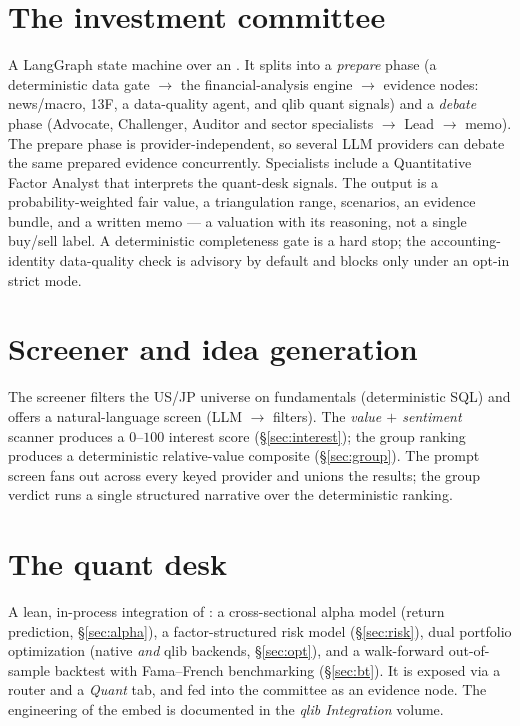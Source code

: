 \documentclass[11pt]{article}
\begin{document}
\section{The investment committee}
A LangGraph state machine over an . It splits into a
\emph{prepare} phase (a deterministic data gate $\to$ the financial-analysis engine
$\to$ evidence nodes: news/macro, 13F, a data-quality agent, and qlib quant
signals) and a \emph{debate} phase (Advocate, Challenger, Auditor and sector
specialists $\to$ Lead $\to$ memo). The prepare phase is provider-independent, so
several LLM providers can debate the same prepared evidence concurrently.
Specialists include a Quantitative Factor Analyst that interprets the quant-desk
signals. The output is a probability-weighted fair value, a triangulation range,
scenarios, an evidence bundle, and a written memo --- a valuation with its
reasoning, not a single buy/sell label. A deterministic completeness gate is a hard
stop; the accounting-identity data-quality check is advisory by default and blocks
only under an opt-in strict mode.

\section{Screener and idea generation}
The screener filters the US/JP universe on fundamentals (deterministic SQL) and
offers a natural-language screen (LLM $\to$ filters). The \emph{value $+$ sentiment}
scanner produces a $0$--$100$ interest score (\S\ref{sec:interest}); the group
ranking produces a deterministic relative-value composite (\S\ref{sec:group}). The
prompt screen fans out across every keyed provider and unions the results; the
group verdict runs a single structured narrative over the deterministic ranking.

\section{The quant desk}
A lean, in-process integration of : a cross-sectional alpha model
(return prediction, \S\ref{sec:alpha}), a factor-structured risk model
(\S\ref{sec:risk}), dual portfolio optimization (native \emph{and} qlib backends,
\S\ref{sec:opt}), and a walk-forward out-of-sample backtest with Fama--French
benchmarking (\S\ref{sec:bt}). It is exposed via a  router and a
\emph{Quant} tab, and fed into the committee as an evidence node. The engineering
of the embed is documented in the \emph{qlib Integration} volume.
\end{document}
